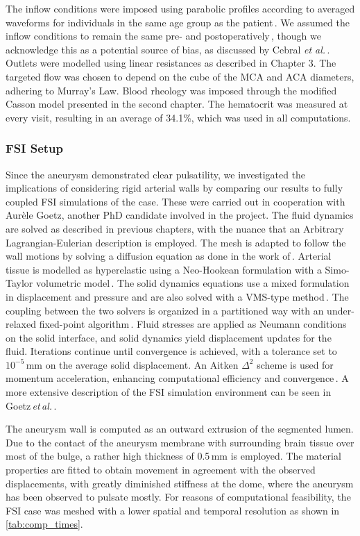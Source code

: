 The inflow conditions were imposed using parabolic profiles according to averaged waveforms for individuals in the same age group as the patient\,\cite{Tanaka2006}. We assumed the inflow conditions to remain the same pre- and postoperatively\,\cite{Cebral2011}, though we acknowledge this as a potential source of bias, as discussed by Cebral \textit{et al.}\,\cite{Cebral2011}. Outlets were modelled using linear resistances as described in Chapter 3. The targeted flow was chosen to depend on the cube of the MCA and ACA diameters, adhering to Murray's Law. Blood rheology was imposed through the modified Casson model presented in the second chapter. The hematocrit was measured at every visit, resulting in an average of 34.1\%, which was used in all computations.

\subsubsection*{FSI Setup}
Since the aneurysm demonstrated clear pulsatility, we investigated the implications of considering rigid arterial walls by comparing our results to fully coupled FSI simulations of the case. These were carried out in cooperation with Aurèle Goetz, another PhD candidate involved in the project. The fluid dynamics are solved as described in previous chapters, with the nuance that an Arbitrary Lagrangian-Eulerian description is employed. The mesh is adapted to follow the wall motions by solving a diffusion equation as done in the work of\,\cite{HABCHI2013306, Sha20}. Arterial tissue is modelled as hyperelastic using a Neo-Hookean formulation with a Simo-Taylor volumetric model\,\cite{NeoH, SimoTaylor}. The solid dynamics equations use a mixed formulation in displacement and pressure and are also solved with a VMS-type method\,\cite{Nemer2021}. The coupling between the two solvers is organized in a partitioned way with an under-relaxed fixed-point algorithm\,\cite{FELIPPA198061}. Fluid stresses are applied as Neumann conditions on the solid interface, and solid dynamics yield displacement updates for the fluid. Iterations continue until convergence is achieved, with a tolerance set to $10^{-5}$\,mm on the average solid displacement. An Aitken $\Delta^2$ scheme is used for momentum acceleration, enhancing computational efficiency and convergence\,\cite{Kuttler, BREUER2012107}. A more extensive description of the FSI simulation environment can be seen in Goetz\,\textit{et\,al.}\,\cite{Aurele}.

The aneurysm wall is computed as an outward extrusion of the segmented lumen. Due to the contact of the aneurysm membrane with surrounding brain tissue over most of the bulge, a rather high thickness of 0.5\,mm is employed. The material properties are fitted to obtain movement in agreement with the observed displacements, with greatly diminished stiffness at the dome, where the aneurysm has been observed to pulsate mostly. For reasons of computational feasibility, the FSI case was meshed with a lower spatial and temporal resolution as shown in \autoref{tab:comp_times}.

